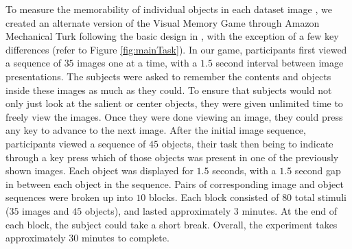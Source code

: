 To measure the memorability of individual objects in each dataset image %
, we created an alternate version of the Visual Memory Game through Amazon Mechanical Turk following the basic design in \cite{isola11}, with the exception of a few key differences (refer to Figure \ref{fig:mainTask}). In our game, participants first viewed a sequence of $35$ images one at a time, with a $1.5$ second interval between image presentations. The subjects were asked to remember the contents and objects inside these images as much as they could. To ensure that subjects would not only just  look at the salient or center objects, they were given unlimited time to freely view the images. Once they were done viewing an image, they could press any key to advance to the next image. After the initial image sequence, participants viewed a sequence of $45$ objects, their task then being to indicate through a key press which of those objects was present in one of the previously shown images. Each object was displayed for $1.5$ seconds, with a $1.5$ second gap in between each object in the sequence. Pairs of corresponding image and object sequences were broken up into $10$ blocks. Each block consisted of $80$ total stimuli ($35$ images and $45$ objects), and lasted approximately $3$ minutes. At the end of each block, the subject could take a short break. Overall, the experiment takes approximately $30$ minutes to complete.


